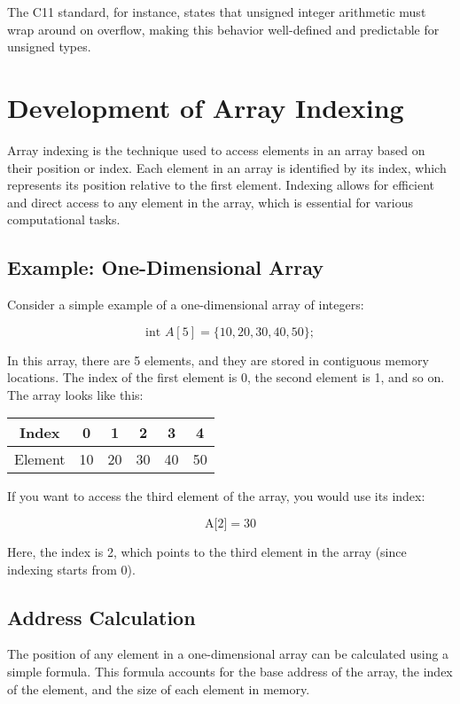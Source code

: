 \documentclass[12pt, oneside]{book}
\begin{document}
The C11 standard, for instance, states that unsigned integer arithmetic must wrap around on overflow, making this behavior well-defined and predictable for unsigned types.


\section{Development of Array Indexing}
	
	Array indexing is the technique used to access elements in an array based on their position or index. Each element in an array is identified by its index, which represents its position relative to the first element. Indexing allows for efficient and direct access to any element in the array, which is essential for various computational tasks.
	
	\subsection{Example: One-Dimensional Array}
	
	Consider a simple example of a one-dimensional array of integers:
	
	\[\text{int } A[5] = \{10, 20, 30, 40, 50\};\]
	
	In this array, there are 5 elements, and they are stored in contiguous memory locations. The index of the first element is 0, the second element is 1, and so on. The array looks like this:
	
	\begin{center}
    		\begin{tabular}{|c|c|c|c|c|c|}
			\hline
				Index & 0 & 1 & 2 & 3 & 4 \\
			\hline
			Element & 10 & 20 & 30 & 40 & 50 \\
			\hline
			\end{tabular}
	\end{center}
	
	If you want to access the third element of the array, you would use its index:
	
	\[\text{A[2]} = 30\]
	
	Here, the index is 2, which points to the third element in the array (since indexing starts from 0). 
		
\subsection{Address Calculation}

The position of any element in a one-dimensional array can be calculated using a simple formula. This formula accounts for the base address of the array, the index of the element, and the size of each element in memory.
\end{document}

